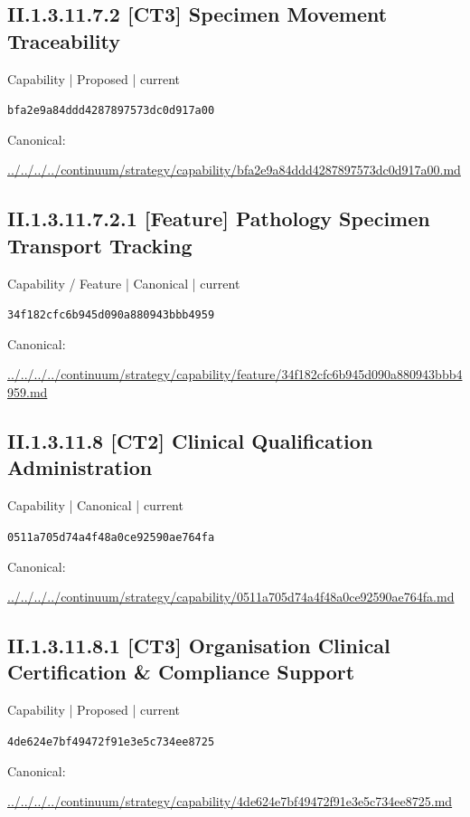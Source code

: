 \documentclass[10pt,a4paper]{article}
\begin{document}
\subsection*{II.1.3.11.7.2 [CT3] Specimen Movement Traceability}
{\small Capability | Proposed | current}\par
\texttt{bfa2e9a84ddd4287897573dc0d917a00}\par
Canonical: \par
{\footnotesize\url{../../../../continuum/strategy/capability/bfa2e9a84ddd4287897573dc0d917a00.md}}\par
\subsection*{II.1.3.11.7.2.1 [Feature] Pathology Specimen Transport Tracking}
{\small Capability / Feature | Canonical | current}\par
\texttt{34f182cfc6b945d090a880943bbb4959}\par
Canonical: \par
{\footnotesize\url{../../../../continuum/strategy/capability/feature/34f182cfc6b945d090a880943bbb4959.md}}\par
\subsection*{II.1.3.11.8 [CT2] Clinical Qualification Administration}
{\small Capability | Canonical | current}\par
\texttt{0511a705d74a4f48a0ce92590ae764fa}\par
Canonical: \par
{\footnotesize\url{../../../../continuum/strategy/capability/0511a705d74a4f48a0ce92590ae764fa.md}}\par
\subsection*{II.1.3.11.8.1 [CT3] Organisation Clinical Certification \& Compliance Support}
{\small Capability | Proposed | current}\par
\texttt{4de624e7bf49472f91e3e5c734ee8725}\par
Canonical: \par
{\footnotesize\url{../../../../continuum/strategy/capability/4de624e7bf49472f91e3e5c734ee8725.md}}\par
\end{document}
